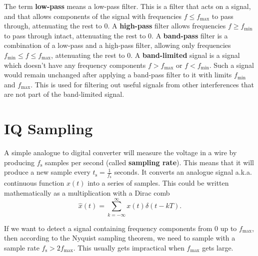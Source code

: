 \documentclass[a4paper,12pt,twoside,openright]{report}
\begin{document}
The term \textbf{low-pass} means a low-pass filter. This is a filter that acts on a signal, and that allows components of the signal with frequencies $f \leq f_\text{max}$ to pass through, attenuating the rest to 0. A \textbf{high-pass} filter allows frequencies $f \geq f_\text{min}$ to pass through intact, attenuating the rest to 0. A \textbf{band-pass} filter is a combination of a low-pass and a high-pass filter, allowing only frequencies $f_\text{min} \leq f \leq f_\text{max}$, attenuating the rest to 0. A \textbf{band-limited} signal is a signal which doesn't have any frequency components $f > f_\text{max}$ or $f < f_\text{min}$. Such a signal would remain unchanged after applying a band-pass filter to it with limits $f_\text{min}$ and $f_\text{max}$. This is used for filtering out useful signals from other interferences that are not part of the band-limited signal.

\section{IQ Sampling} 
\label{sec:IQSampling}

A simple analogue to digital converter will measure the voltage in a wire by producing $f_\text{s}$ samples per second (called \textbf{sampling rate}). This means that it will produce a new sample every $t_\text{s} = \frac{1}{f_\text{s}}$ seconds. It converts an analogue signal a.k.a. continuous function $x(t)$ into a series of samples. This could be written mathematically as a multiplication with a Dirac comb
\begin{equation}
\label{eq:sampling}
\hat{x}(t) = \sum_{k=-\infty}^{\infty} x(t) \delta(t - kT) .
\end{equation}

If we want to detect a signal containing frequency components from $0$ up to $f_\text{max}$, then according to the Nyquist sampling theorem, we need to sample with a sample rate $f_\text{s} > 2 f_\text{max}$. This usually gets impractical when $f_\text{max}$ gets large.
\end{document}
